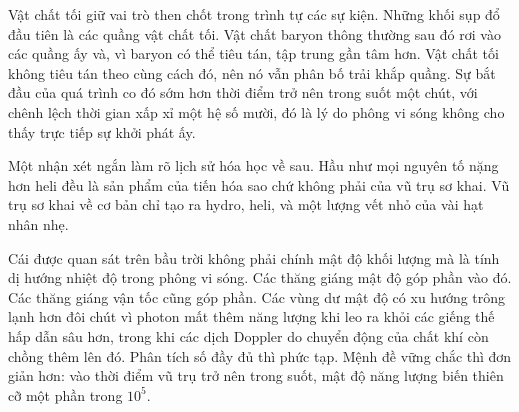 Vật chất tối giữ vai trò then chốt trong trình tự các sự kiện. Những khối sụp đổ đầu tiên là các quầng vật chất tối. Vật chất baryon thông thường sau đó rơi vào các quầng ấy và, vì baryon có thể tiêu tán, tập trung gần tâm hơn. Vật chất tối không tiêu tán theo cùng cách đó, nên nó vẫn phân bố trải khắp quầng. Sự bắt đầu của quá trình co đó sớm hơn thời điểm trở nên trong suốt một chút, với chênh lệch thời gian xấp xỉ một hệ số mười, đó là lý do phông vi sóng không cho thấy trực tiếp sự khởi phát ấy.

Một nhận xét ngắn làm rõ lịch sử hóa học về sau. Hầu như mọi nguyên tố nặng hơn heli đều là sản phẩm của tiến hóa sao chứ không phải của vũ trụ sơ khai. Vũ trụ sơ khai về cơ bản chỉ tạo ra hydro, heli, và một lượng vết nhỏ của vài hạt nhân nhẹ.

Cái được quan sát trên bầu trời không phải chính mật độ khối lượng mà là tính dị hướng nhiệt độ trong phông vi sóng. Các thăng giáng mật độ góp phần vào đó. Các thăng giáng vận tốc cũng góp phần. Các vùng dư mật độ có xu hướng trông lạnh hơn đôi chút vì photon mất thêm năng lượng khi leo ra khỏi các giếng thế hấp dẫn sâu hơn, trong khi các dịch Doppler do chuyển động của chất khí còn chồng thêm lên đó. Phân tích số đầy đủ thì phức tạp. Mệnh đề vững chắc thì đơn giản hơn: vào thời điểm vũ trụ trở nên trong suốt, mật độ năng lượng biến thiên cỡ một phần trong \(10^5\).

\begin{classroomqa}
\end{classroomqa}

\begin{classroomqa}
\end{classroomqa}

\begin{classroomqa}
\end{classroomqa}

